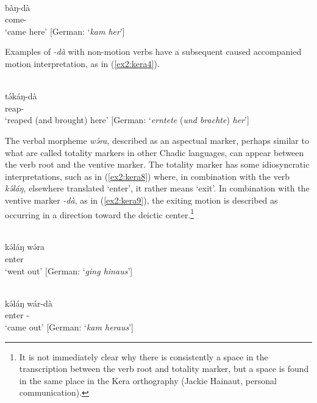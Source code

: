 \ea\label{ex2:kera3}
 \\
\gll bàŋ-dà	\\
come-	\\
\glt `came here' [German: `\textit{kam her}']
\z 	

Examples of \textit{-dà} with non-motion verbs have a subsequent caused accompanied motion interpretation, as in (\ref{ex2:kera4}). 

\ea\label{ex2:kera4}
 \\
\gll tə́káŋ-dà	\\
reap-	\\
\glt `reaped (and brought) here' [German: `\textit{erntete} (\textit{und brachte}) \textit{her}']
\z 

The verbal morpheme \textit{wə́ra}, described as an aspectual marker, perhaps similar to what are called totality markers in other Chadic languages, can appear between the verb root and the ventive marker. The totality marker has some idiosyncratic interpretations, such as in (\ref{ex2:kera8}) where, in combination with the verb \textit{kə́láŋ}, elsewhere translated `enter', it rather means `exit'. In combination with the ventive marker \textit{-dà}, as in (\ref{ex2:kera9}), the exiting motion is described as occurring in a direction toward the deictic center.\footnote{It is not immediately clear why there is consistently a space in the transcription between the verb root and totality marker, but a space is found in the same place in the Kera orthography (Jackie Hainaut, personal communication).}

\ea\label{ex2:kera8}
 \\
\gll kə́láŋ wə́ra	\\
enter 	\\
\glt `went out' [German: `\textit{ging hinaus}']

\ex\label{ex2:kera9}
 \\
\gll kə́láŋ wár-dà	\\
enter -	\\
\glt `came out' [German: `\textit{kam heraus}']
\z 


